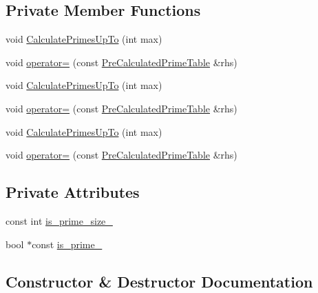 \subsection*{Private Member Functions}
\begin{DoxyCompactItemize}
\item 
void \mbox{\hyperlink{class_pre_calculated_prime_table_a393cb4947a57da9442e435eeff168b76}{Calculate\+Primes\+Up\+To}} (int max)
\item 
void \mbox{\hyperlink{class_pre_calculated_prime_table_a67012c43b78cee27b891a9934becc455}{operator=}} (const \mbox{\hyperlink{class_pre_calculated_prime_table}{Pre\+Calculated\+Prime\+Table}} \&rhs)
\item 
void \mbox{\hyperlink{class_pre_calculated_prime_table_a393cb4947a57da9442e435eeff168b76}{Calculate\+Primes\+Up\+To}} (int max)
\item 
void \mbox{\hyperlink{class_pre_calculated_prime_table_a67012c43b78cee27b891a9934becc455}{operator=}} (const \mbox{\hyperlink{class_pre_calculated_prime_table}{Pre\+Calculated\+Prime\+Table}} \&rhs)
\item 
void \mbox{\hyperlink{class_pre_calculated_prime_table_a393cb4947a57da9442e435eeff168b76}{Calculate\+Primes\+Up\+To}} (int max)
\item 
void \mbox{\hyperlink{class_pre_calculated_prime_table_a67012c43b78cee27b891a9934becc455}{operator=}} (const \mbox{\hyperlink{class_pre_calculated_prime_table}{Pre\+Calculated\+Prime\+Table}} \&rhs)
\end{DoxyCompactItemize}
\subsection*{Private Attributes}
\begin{DoxyCompactItemize}
\item 
const int \mbox{\hyperlink{class_pre_calculated_prime_table_ad4275df41c5e5be3cad8c5abeaad1ac6}{is\+\_\+prime\+\_\+size\+\_\+}}
\item 
bool $\ast$const \mbox{\hyperlink{class_pre_calculated_prime_table_a66a8e1b3f58e76e620c1a8da32742aa9}{is\+\_\+prime\+\_\+}}
\end{DoxyCompactItemize}


\subsection{Constructor \& Destructor Documentation}
\mbox{\label{class_pre_calculated_prime_table_a6bb947504421e31da70d2c71576be350}} 
